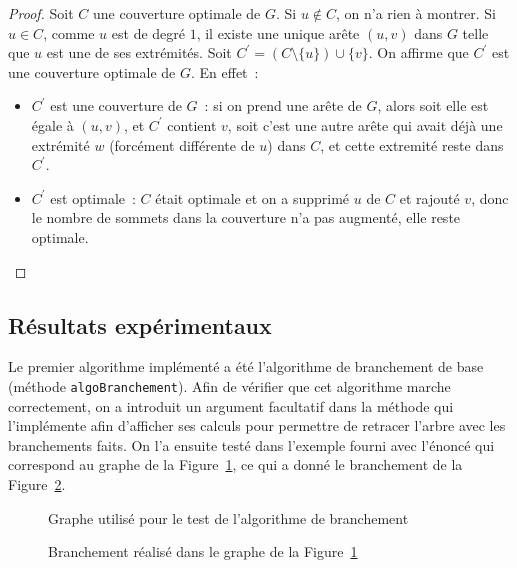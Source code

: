 \documentclass[a4paper,11pt]{amsart}
\theoremstyle{plain}
\begin{document}
\begin{proof}
Soit $C$ une couverture optimale de $G$. Si $u \notin C$, on n'a rien à montrer. Si $u \in C$, comme $u$ est de degré $1$, il existe une unique arête $(u, v)$ dans $G$ telle que $u$ est une de ses extrémités. Soit $C^\prime = (C \setminus \{u\}) \cup \{v\}$. On affirme que $C^\prime$ est une couverture optimale de $G$. En effet~:
\begin{itemize}
\item $C^\prime$ est une couverture de $G$~: si on prend une arête de $G$, alors soit elle est égale à $(u, v)$, et $C^\prime$ contient $v$, soit c'est une autre arête qui avait déjà une extrémité $w$ (forcément différente de $u$) dans $C$, et cette extremité reste dans $C^\prime$.

\item $C^\prime$ est optimale~: $C$ était optimale et on a supprimé $u$ de $C$ et rajouté $v$, donc le nombre de sommets dans la couverture n'a pas augmenté, elle reste optimale.\qedhere
\end{itemize}
\end{proof}

\subsection{Résultats expérimentaux}
\label{AlgoExactExperim}

Le premier algorithme implémenté a été l'algorithme de branchement de base (méthode \texttt{algoBranchement}). Afin de vérifier que cet algorithme marche correctement, on a introduit un argument facultatif dans la méthode qui l'implémente afin d'afficher ses calculs pour permettre de retracer l'arbre avec les branchements faits. On l'a ensuite testé dans l'exemple fourni avec l'énoncé qui correspond au graphe de la Figure~\ref{FigGrapheTestBranchement}, ce qui a donné le branchement de la Figure~\ref{FigTestBranchement}.

\begin{figure}[ht]
\centering

\caption{Graphe utilisé pour le test de l'algorithme de branchement}
\label{FigGrapheTestBranchement}
\end{figure}

\begin{figure}
\centering
\resizebox{\textwidth}{!}{}
\caption{Branchement réalisé dans le graphe de la Figure~\ref{FigGrapheTestBranchement}}
\label{FigTestBranchement}
\end{figure}
\end{document}
